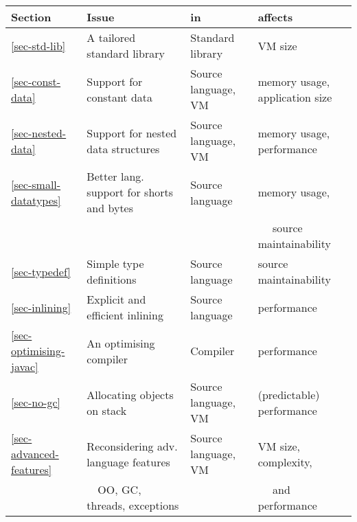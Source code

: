 \begin{tabular}{llll}
\toprule
\bfseries Section           & \bfseries Issue                               & \bfseries in          & \bfseries affects \\
\midrule
\ref{sec-std-lib}           & A tailored standard library                   & Standard library      & VM size \\
\ref{sec-const-data}        & Support for constant data                     & Source language, VM   & memory usage, application size \\
\ref{sec-nested-data}       & Support for nested data structures            & Source language, VM   & memory usage, performance \\
\ref{sec-small-datatypes}   & Better lang. support for shorts and bytes     & Source language       & memory usage, \\
                            &                                               &                       & ~~  source maintainability\\
\ref{sec-typedef}           & Simple type definitions                       & Source language       & source maintainability \\
\ref{sec-inlining}          & Explicit and efficient inlining               & Source language       & performance \\
\ref{sec-optimising-javac}  & An optimising compiler                        & Compiler              & performance \\
\ref{sec-no-gc}             & Allocating objects on stack                   & Source language, VM   & (predictable) performance \\
\ref{sec-advanced-features} & Reconsidering adv. language features          & Source language, VM   & VM size, complexity, \\
                            & ~~OO, GC, threads, exceptions                 &                       & ~~ and performance \\
\bottomrule
\end{tabular}
